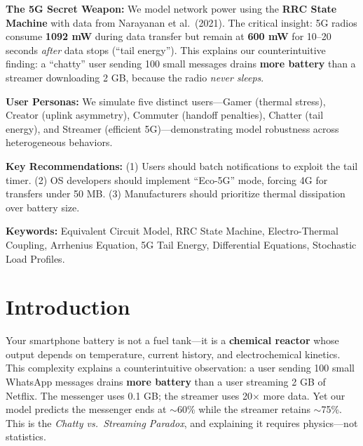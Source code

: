 \documentclass[12pt]{article}
\begin{document}
\vspace{0.5em}
\noindent \textbf{The 5G Secret Weapon:} We model network power using the \textbf{RRC State Machine} with data from Narayanan et al.\ (2021). The critical insight: 5G radios consume \textbf{1092 mW} during data transfer but remain at \textbf{600 mW} for 10--20 seconds \textit{after} data stops (``tail energy''). This explains our counterintuitive finding: a ``chatty'' user sending 100 small messages drains \textbf{more battery} than a streamer downloading 2 GB, because the radio \textit{never sleeps}.

\vspace{0.5em}
\noindent \textbf{User Personas:} We simulate five distinct users—Gamer (thermal stress), Creator (uplink asymmetry), Commuter (handoff penalties), Chatter (tail energy), and Streamer (efficient 5G)—demonstrating model robustness across heterogeneous behaviors.

\vspace{0.5em}
\noindent \textbf{Key Recommendations:} (1) Users should batch notifications to exploit the tail timer. (2) OS developers should implement ``Eco-5G'' mode, forcing 4G for transfers under 50 MB. (3) Manufacturers should prioritize thermal dissipation over battery size.

\vspace{0.5em}
\noindent \textbf{Keywords:} Equivalent Circuit Model, RRC State Machine, Electro-Thermal Coupling, Arrhenius Equation, 5G Tail Energy, Differential Equations, Stochastic Load Profiles.


\clearpage
\pagestyle{fancy}
\tableofcontents
\newpage
\setcounter{page}{1}

\section{Introduction}

Your smartphone battery is not a fuel tank---it is a \textbf{chemical reactor} whose output depends on temperature, current history, and electrochemical kinetics. This complexity explains a counterintuitive observation: a user sending 100 small WhatsApp messages drains \textbf{more battery} than a user streaming 2 GB of Netflix. The messenger uses 0.1 GB; the streamer uses 20$\times$ more data. Yet our model predicts the messenger ends at $\sim$60\% while the streamer retains $\sim$75\%. This is the \textit{Chatty vs.\ Streaming Paradox}, and explaining it requires physics---not statistics.
\end{document}
